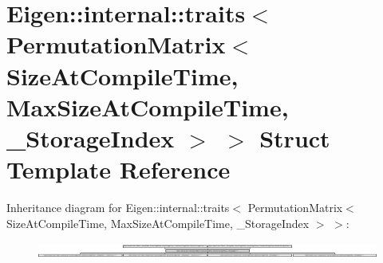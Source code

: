 \hypertarget{struct_eigen_1_1internal_1_1traits_3_01_permutation_matrix_3_01_size_at_compile_time_00_01_max_sd0808d93099012556270f7c7cd36fcc5}{}\section{Eigen\+:\+:internal\+:\+:traits$<$ Permutation\+Matrix$<$ Size\+At\+Compile\+Time, Max\+Size\+At\+Compile\+Time, \+\_\+\+Storage\+Index $>$ $>$ Struct Template Reference}
\label{struct_eigen_1_1internal_1_1traits_3_01_permutation_matrix_3_01_size_at_compile_time_00_01_max_sd0808d93099012556270f7c7cd36fcc5}
Inheritance diagram for Eigen\+:\+:internal\+:\+:traits$<$ Permutation\+Matrix$<$ Size\+At\+Compile\+Time, Max\+Size\+At\+Compile\+Time, \+\_\+\+Storage\+Index $>$ $>$\+:\begin{figure}[H]
\begin{center}
\leavevmode
\includegraphics[height=0.509091cm]{struct_eigen_1_1internal_1_1traits_3_01_permutation_matrix_3_01_size_at_compile_time_00_01_max_sd0808d93099012556270f7c7cd36fcc5}
\end{center}
\end{figure}
